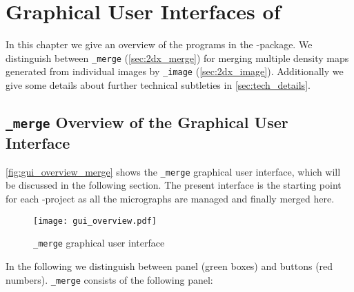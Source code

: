 \section{Graphical User Interfaces of {\twodx}}
\label{sec:gui}

In this chapter we give an overview of the programs in the {\twodx}-package. We distinguish between {\twodx}\texttt{\_merge} (\autoref{sec:2dx_merge}) for merging multiple density maps generated from individual images by {\twodx}\texttt{\_image} (\autoref{sec:2dx_image}). Additionally we give some details about further technical subtleties in \autoref{sec:tech_details}.

\subsection{{\twodx}\texttt{\_merge} Overview of the Graphical User Interface}
\label{sec:2dx_merge}
\autoref{fig:gui_overview_merge} shows the {\twodx}\texttt{\_merge} graphical user interface, which will be discussed in the following section. The present interface is the starting point for each {\twodx}-project as all the micrographs are managed and finally merged here.

\begin{figure}[H]
	\centering
	\texttt{[image: gui\_overview.pdf]}
	\caption{{\twodx}\texttt{\_merge} graphical user interface}
	\label{fig:gui_overview_merge}
\end{figure}

In the following we distinguish between panel (green boxes) and buttons (red numbers). {\twodx}\texttt{\_merge} consists of the following panel:


